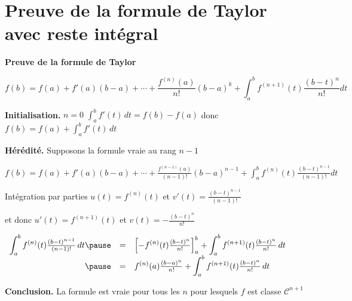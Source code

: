 \section{Preuve de la formule de Taylor avec reste intégral}


\begin{frame}

\vspace*{-1ex}

\textbf{Preuve de la formule de Taylor }

\pause

{\small 
\[
f(b)=f(a)+f'(a)(b-a)+\cdots
+\frac{f^{(n)}(a)}{n!}(b-a)^k+\int_a^b f^{(n+1)}(t)\frac{(b-t)^n}{n!}dt
\]

\pause

\pause


\textbf{Initialisation.} $n=0$ 
$\int_a^b f'(t) \, dt=f(b)-f(a)$ donc 
$f(b)=f(a)+\int_a^b f'(t) \, dt$

\pause
\medskip


\textbf{Hérédité.}
Supposons la formule vraie au rang $n-1$
 
$f(b)=f(a)+f'(a)(b-a)+\cdots
+\frac{f^{(n-1)}(a)}{(n-1)!}(b-a)^{n-1}
+\int_a^bf^{(n)}(t)\frac{(b-t)^{n-1}}{(n-1)!}dt$

\pause

Intégration par parties $u(t)=f^{(n)}(t)$ et $v'(t) = \frac{(b-t)^{n-1}}{(n-1)!}$

\pause

\hfill et donc  $u'(t)= f^{(n+1)}(t)$ et $v(t) = - \frac{(b-t)^{n}}{n!}$

\pause
\medskip

$
\begin{array}{rcl}
\displaystyle \int_a^b f^{(n)}(t) \tfrac{(b-t)^{n-1}}{(n-1)!} \, dt 
\pause
  & = & \displaystyle \left[-f^{(n)}(t)\tfrac{(b-t)^{n}}{n!}\right]_a^b + \int_a^b f^{(n+1)}(t) \tfrac{(b-t)^{n}}{n!} \, dt \\
\pause
  & = & \displaystyle f^{(n)}(a)\tfrac{(b-a)^{n}}{n!} + \int_a^b f^{(n+1)}(t) \tfrac{(b-t)^{n}}{n!}\, dt \\
\end{array}
$  



\pause
\medskip

\textbf{Conclusion.}\! La formule est vraie pour tous les $n$ pour lesquels $f$ est classe\! $\mathcal{C}^{n+1}$ 

}

\end{frame}

